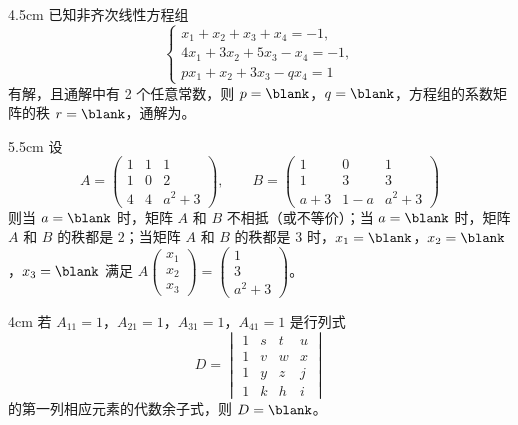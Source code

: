 

\begin{problem}{}{4.5cm}
已知非齐次线性方程组
\[
\begin{cases}
x_1+x_2+x_3+x_4=-1,\\
4x_1+3x_2+5x_3-x_4=-1,\\
px_1+x_2+3x_3-qx_4=1
\end{cases}
\]
有解，且通解中有 2 个任意常数，则 $p=\blank$，$q=\blank$，方程组的系数矩阵的秩 $r=\blank$，通解为\blank[5.5cm]。
\end{problem}

\begin{problem}{}{5.5cm}
设
\[
A=\begin{pmatrix}1&1&1\\1&0&2\\4&4&a^2+3\end{pmatrix},\qquad
B=\begin{pmatrix}1&0&1\\1&3&3\\a+3&1-a&a^2+3\end{pmatrix}
\]
则当 $a=\blank$ 时，矩阵 $A$ 和 $B$ 不相抵（或不等价）；当 $a=\blank$ 时，矩阵 $A$ 和 $B$ 的秩都是 $2$；当矩阵 $A$ 和 $B$ 的秩都是 $3$ 时，$x_1=\blank$，$x_2=\blank$，$x_3=\blank$ 满足
$A\begin{pmatrix}x_1\\x_2\\x_3\end{pmatrix}=\begin{pmatrix}1\\3\\a^2+3\end{pmatrix}$。
\end{problem}

\begin{problem}{}{4cm}
若 $A_{11}=1$，$A_{21}=1$，$A_{31}=1$，$A_{41}=1$ 是行列式
\[
D=\begin{vmatrix}1&s&t&u\\1&v&w&x\\1&y&z&j\\1&k&h&i\end{vmatrix}
\]
的第一列相应元素的代数余子式，则 $D=\blank$。
\end{problem}

